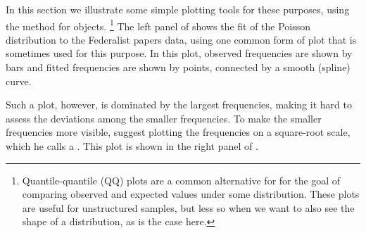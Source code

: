\documentclass[11pt]{book}\usepackage[]{graphicx}\usepackage[]{color}
\begin{document}
In this section we illustrate some simple plotting tools for 
these purposes, using the  method for 
 objects.%
\footnote{
Quantile-quantile (QQ) plots are a common alternative for 
for the goal of comparing observed and expected values
under some distribution.  These plots are useful for 
unstructured samples, but less so when we want to also
see the shape of a distribution, as is the case here.
}
The left panel of 
 shows the fit of the Poisson distribution to the Federalist papers data, using one common form of plot that is sometimes
used for this purpose.
In this plot, observed frequencies are shown by bars and fitted
frequencies are shown by points, connected by a smooth (spline)
curve.

Such a plot, however, is dominated by the largest frequencies,
making it hard to assess the deviations among the smaller frequencies.
To make the smaller frequencies more visible, \citet{Tukey:77}
suggest plotting the frequencies  on a square-root scale,
which he calls a . This plot is shown in the right 
panel of .
\end{document}
